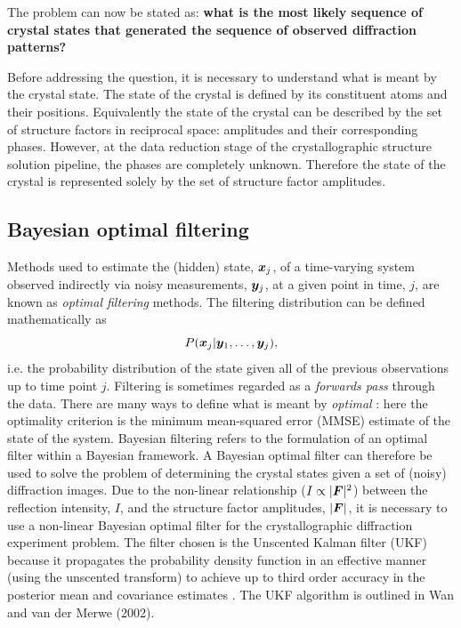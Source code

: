 The problem can now be stated as:
\textbf{what is the most likely sequence of crystal states that generated the sequence of observed diffraction patterns?}

Before addressing the question, it is necessary to understand what is meant by the crystal state.
The state of the crystal is defined by its constituent atoms and their positions.
Equivalently the state of the crystal can be described by the set of structure factors in reciprocal space: amplitudes and their corresponding phases.
However, at the data reduction stage of the crystallographic structure solution pipeline, the phases are completely unknown.
Therefore the state of the crystal is represented solely by the set of structure factor amplitudes.

\subsection{Bayesian optimal filtering}
\label{sub:Bayesian optimal filtering}
Methods used to estimate the (hidden) state, $\boldsymbol{x}_j$, of a time-varying system observed indirectly via noisy measurements, $\boldsymbol{y}_j$, at a given point in time, $j$,  are known as \textit{optimal filtering} methods.
The filtering distribution can be defined mathematically as
\begin{equation}
    P(\boldsymbol{x}_j | \boldsymbol{y}_1, \ldots, \boldsymbol{y}_j),
    \label{eq:Filtering Distribution}
\end{equation}
i.e. the probability distribution of the state given all of the previous observations up to time point $j$.
Filtering is sometimes regarded as a \textit{forwards pass} through the data.
There are many ways to define what is meant by \textit{optimal} \cite{chen2003bayesian}: here the optimality criterion is the minimum mean-squared error (MMSE) estimate of the state of the system.
Bayesian filtering refers to the formulation of an optimal filter within a Bayesian framework.
A Bayesian optimal filter can therefore be used to solve the problem of determining the crystal states given a set of (noisy) diffraction images.
Due to the non-linear relationship ($I \propto |\boldsymbol{F}|^2$) between the reflection intensity, $I$, and the structure factor amplitudes, $|\boldsymbol{F}|$, it is necessary to use a non-linear Bayesian optimal filter for the crystallographic diffraction experiment problem.
The filter chosen is the Unscented Kalman filter (UKF) because it propagates the probability density function in an effective manner (using the unscented transform) to achieve up to third order accuracy in the posterior mean and covariance estimates \cite{wan2000unscented}.
The UKF algorithm is outlined in Wan and van der Merwe (2002).

